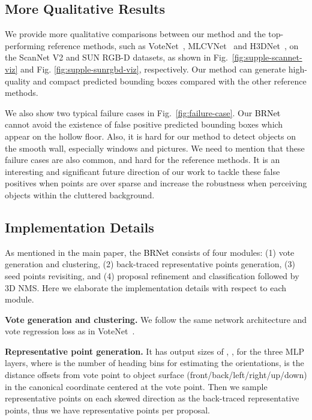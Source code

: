 \documentclass[final]{cvpr}
\newcommand{\method}{\textcolor{black}{BRNet }}
\begin{document}
\subsection{More Qualitative Results}
\label{subsec:qualitative-results}


We provide more qualitative comparisons between our method and the top-performing reference methods, such as VoteNet~\cite{votenet}, MLCVNet~\cite{mlcvnet} and H3DNet~\cite{h3dnet}, on the ScanNet V2 and SUN RGB-D datasets, as shown in Fig.~\ref{fig:supple-scannet-viz} and Fig. \ref{fig:supple-sunrgbd-viz}, respectively.
Our method can generate high-quality and compact predicted bounding boxes compared with the other reference methods.


We also show two typical failure cases in Fig.~\ref{fig:failure-case}. Our \method cannot avoid the existence of false positive predicted bounding boxes which appear on the hollow floor. Also, it is hard for our method to detect objects on the smooth wall, especially windows and pictures.
We need to mention that these failure cases are also common, and hard for the reference methods.
It is an interesting and significant future direction of our work to tackle these false positives when points are over sparse and increase the robustness when perceiving objects within the cluttered background. 

\subsection{Implementation Details}
\label{subsec:implementation-details}

As mentioned in the main paper, the \method consists of four modules: 
(1) vote generation and clustering, 
(2) back-traced representative points generation, 
(3) seed points revisiting, and 
(4) proposal refinement and classification followed by 3D NMS. 
Here we elaborate the implementation details with respect to each module.


\vspace{+1mm}
\noindent\textbf{Vote generation and clustering.}
We follow the same network architecture and vote regression loss as in VoteNet~\cite{votenet}.


\vspace{+1mm}
\noindent\textbf{Representative point generation.}
It has output sizes of , ,  for the three MLP layers, where  is the number of heading bins for estimating the orientations,  is the  distance offsets from vote point to object surface (front/back/left/right/up/down) in the canonical coordinate centered at the vote point. Then we sample  representative points on each skewed direction as the back-traced representative points, thus we have  representative points per proposal.
\end{document}
